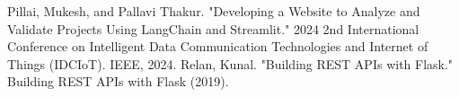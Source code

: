 \documentclass[a4j, twocolumn]{article}
\begin{document}
\begin{enumerate}
Pillai, Mukesh, and Pallavi Thakur. "Developing a Website to Analyze and Validate Projects Using LangChain and Streamlit." 2024 2nd International Conference on Intelligent Data Communication Technologies and Internet of Things (IDCIoT). IEEE, 2024.
Relan, Kunal. "Building REST APIs with Flask." Building REST APIs with Flask (2019).
\end{enumerate}
\end{document}

